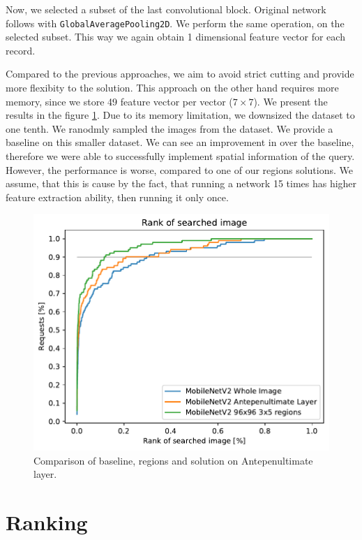 Now, we selected a subset of the last convolutional block. Original network follows with \verb+GlobalAveragePooling2D+. We perform the same operation, on the selected subset. This way we again obtain 1 dimensional feature vector for each record.

Compared to the previous approaches, we aim to avoid strict cutting and provide more flexibity to the solution. This approach on the other hand requires more memory, since we store 49 feature vector per vector ($7\times7$). We present the results in the figure \ref{fig:antepenultimate}. Due to its memory limitation, we downsized the dataset to one tenth. We ranodmly sampled the images from the dataset. We provide a baseline on this smaller dataset. We can see an improvement in over the baseline, therefore we were able to successfully implement spatial information of the query. However, the performance is worse, compared to one of our regions solutions. We assume, that this is cause by the fact, that running a network 15 times has higher feature extraction ability, then running it only once.

\begin{figure}
    \centering
    \includegraphics{graphs/adaf8d435bb40406f9ce40654ec396e04453ab76cf0776d2a87d385055d5424f.pdf}
    \caption{Comparison of baseline, regions and solution on Antepenultimate layer.}
    \label{fig:antepenultimate}
\end{figure}


\section{Ranking}

